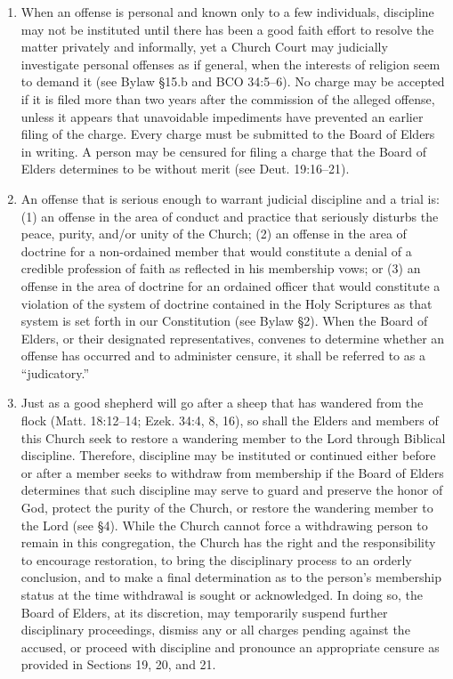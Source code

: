 \documentclass[
]{book}
\begin{document}
\begin{enumerate}
\item
  When an offense is personal and known only to a few individuals, discipline may not be instituted until there has been a good faith effort to resolve the matter privately and informally, yet a Church Court may judicially investigate personal offenses as if general, when the interests of religion seem to demand it (see Bylaw §15.b and BCO 34:5--6). No charge may be accepted if it is filed more than two years after the commission of the alleged offense, unless it appears that unavoidable impediments have prevented an earlier filing of the charge. Every charge must be submitted to the Board of Elders in writing. A person may be censured for filing a charge that the Board of Elders determines to be without merit (see Deut. 19:16--21).
\item
  An offense that is serious enough to warrant judicial discipline and a trial is: (1) an offense in the area of conduct and practice that seriously disturbs the peace, purity, and/or unity of the Church; (2) an offense in the area of doctrine for a non-ordained member that would constitute a denial of a credible profession of faith as reflected in his membership vows; or (3) an offense in the area of doctrine for an ordained officer that would constitute a violation of the system of doctrine contained in the Holy Scriptures as that system is set forth in our Constitution (see Bylaw §2). When the Board of Elders, or their designated representatives, convenes to determine whether an offense has occurred and to administer censure, it shall be referred to as a ``judicatory.''
\item
  Just as a good shepherd will go after a sheep that has wandered from the flock (Matt. 18:12--14; Ezek. 34:4, 8, 16), so shall the Elders and members of this Church seek to restore a wandering member to the Lord through Biblical discipline. Therefore, discipline may be instituted or continued either before or after a member seeks to withdraw from membership if the Board of Elders determines that such discipline may serve to guard and preserve the honor of God, protect the purity of the Church, or restore the wandering member to the Lord (see §4). While the Church cannot force a withdrawing person to remain in this congregation, the Church has the right and the responsibility to encourage restoration, to bring the disciplinary process to an orderly conclusion, and to make a final determination as to the person's membership status at the time withdrawal is sought or acknowledged. In doing so, the Board of Elders, at its discretion, may temporarily suspend further disciplinary proceedings, dismiss any or all charges pending against the accused, or proceed with discipline and pronounce an appropriate censure as provided in Sections 19, 20, and 21.

\end{enumerate}
\end{document}
